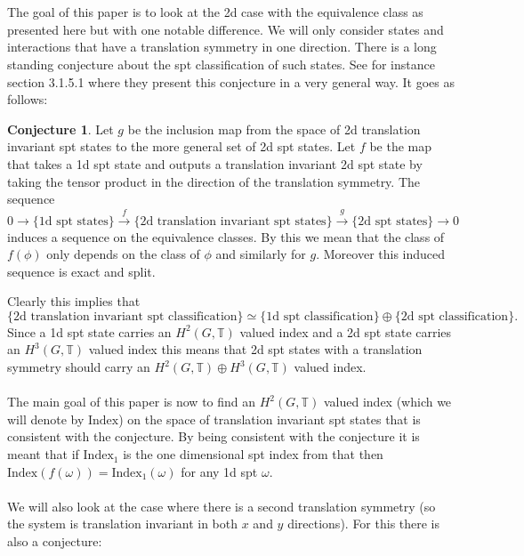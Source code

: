 \documentclass[12pt,a4paper,twoside]{article}
\newcommand{\TT}{\mathbb T}
\theoremstyle{definition}
\newtheorem{conjecture}[theorem]{Conjecture}
\numberwithin{equation}{section}
\begin{document}
\\\\
The goal of this paper is to look at the 2d case with the equivalence class as presented here but with one notable difference. We will only consider states and interactions that have a translation symmetry in one direction. There is a long standing conjecture about the spt classification of such states. See for instance \cite{xiong2019classification} section 3.1.5.1 where they present this conjecture in a very general way. It goes as follows:
\begin{conjecture}\label{conj}
	Let $g$ be the inclusion map from the space of 2d translation invariant spt states to the more general set of 2d spt states. Let $f$ be the map that takes a 1d spt state and outputs a translation invariant 2d spt state by taking the tensor product in the direction of the translation symmetry. The sequence
	\begin{equation}
		0\rightarrow\{\text{1d spt states}\}\stackrel{f}{\rightarrow}\{\text{2d translation invariant spt states}\}\stackrel{g}{\rightarrow}\{\text{2d spt states}\}\rightarrow 0
	\end{equation}
	induces a sequence on the equivalence classes. By this we mean that the class of $f(\phi)$ only depends on the class of $\phi$ and similarly for $g$. Moreover this induced sequence is exact and split.
\end{conjecture}
Clearly this implies that
\begin{equation}
	\{\text{2d translation invariant spt classification}\}\simeq \{\text{1d spt classification}\}\oplus \{\text{2d spt classification}\}.
\end{equation}
Since a 1d spt state carries an $H^2(G,\TT)$ valued index and a 2d spt state carries an $H^3(G,\TT)$ valued index this means that 2d spt states with a translation symmetry should carry an $H^2(G,\TT)\oplus H^3(G,\TT)$ valued index.\\\\
The main goal of this paper is now to find an $H^2(G,\TT)$ valued index (which we will denote by $\textrm{Index}$) on the space of translation invariant spt states that is consistent with the conjecture. By being consistent with the conjecture it is meant that if $\textrm{Index}_1$ is the one dimensional spt index from \cite{ogata2019classification} that then $\textrm{Index}(f(\omega))=\textrm{Index}_1(\omega)$ for any 1d spt $\omega$.\\\\
We will also look at the case where there is a second translation symmetry (so the system is translation invariant in both $x$ and $y$ directions). For this there is also a conjecture:
\end{document}
